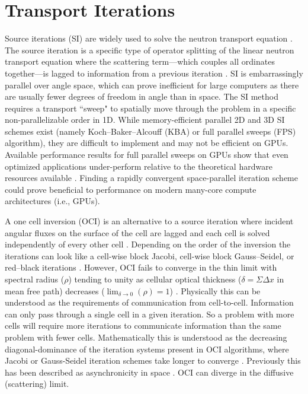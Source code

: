 \section{Transport Iterations}

Source iterations (SI) are widely used to solve the \sn neutron transport equation \cite{adams_fast_2002}.
The source iteration is a specific type of operator splitting of the linear neutron transport equation where the scattering term---which couples all \sn ordinates together---is lagged to information from a previous iteration \cite{lewis_computational_1984}.
SI is embarrassingly parallel over angle space, which can prove inefficient for large computers as there are usually fewer degrees of freedom in angle than in space.
The SI method requires a transport ``sweep" to spatially move through the problem in a specific non-parallelizable order in 1D.
While memory-efficient parallel 2D and 3D SI schemes exist (namely Koch--Baker--Alcouff (KBA) or full parallel sweeps (FPS) \cite{baker_computational_2017, baker_kba_2017, alcouffe_time-dependent_1998} algorithm), they are difficult to implement and may not be efficient on GPUs.
Available performance results for full parallel sweeps on GPUs show that even optimized applications under-perform relative to the theoretical hardware resources available \cite{Thomas_2024_profiling, wolfe2022roofline, kunen_kripke_2015, zerr_partisn_2019}.
Finding a rapidly convergent space-parallel iteration scheme could prove beneficial to performance on modern many-core compute architectures (i.e., GPUs).

A one cell inversion (OCI) is an alternative to a source iteration where incident angular fluxes on the surface of the cell are lagged and each cell is solved independently of every other cell \cite{rosa_cellwise_2013, adams_fast_2002}.
Depending on the order of the inversion the iterations can look like a cell-wise block Jacobi, cell-wise block Gauss--Seidel, or red--black iterations \cite{man1994parallel}.
However, OCI fails to converge in the thin limit with spectral radius ($\rho$) tending to unity as cellular optical thickness ($\delta=\Sigma\Delta x$ in mean free path) decreases ($\lim_{\delta\rightarrow0}(\rho) = 1$) \cite{tsa_slab2006rosa}.
Physically this can be understood as the requirements of communication from cell-to-cell.
Information can only pass through a single cell in a given iteration.
So a problem with more cells will require more iterations to communicate information than the same problem with fewer cells.
Mathematically this is understood as the decreasing diagonal-dominance of the iteration systems present in OCI algorithms, where Jacobi or Gauss-Seidel iteration schemes take longer to converge \cite{isaacson_numerical_1966}.
Previously this has been described as asynchronicity in space \cite{hoagland_hybrid_2021}.
OCI can diverge in the diffusive (scattering) limit.

